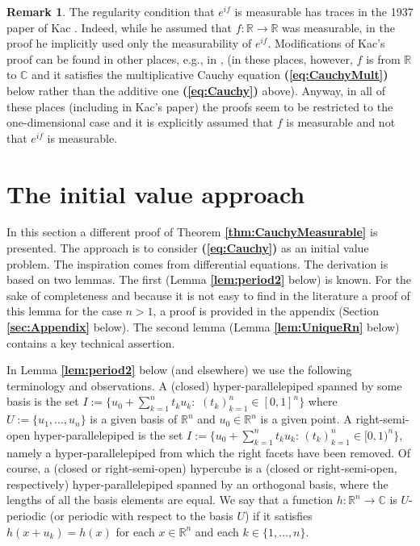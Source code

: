 \documentclass[12 pt]{amsart}
\theoremstyle{definition}
\newtheorem{remark}[thm]{Remark}
\newcommand{\R}{\mathbb{R}}
\newcommand{\C}{\mathbb{C}}
\newcommand{\bref}[1]{\textbf{\ref{#1}}} %
\newcommand{\beqref}[1]{\textbf{(\ref{#1})}} %
\begin{document}
\begin{remark}\label{rem:Kac}
The regularity condition that $e^{if}$ is measurable has traces in the 1937 paper of Kac \cite{Kac}. Indeed, while he assumed that $f:\R\to\R$ was measurable, in the proof he implicitly  used only the  measurability of  $e^{if}$. Modifications of Kac's proof can be found in other places, e.g., in \cite[pp. 54--56]{AczelDhombres}, \cite[pp. 39--40]{Czerwik2002book} (in these places, however, $f$ is  from $\R$ to $\C$ and it satisfies the multiplicative Cauchy equation  \beqref{eq:CauchyMult} below rather than the additive one \beqref{eq:Cauchy} above). Anyway, in all of these places (including in Kac's paper) the proofs seem to be restricted to the one-dimensional case and it is explicitly assumed that $f$ is measurable and not that $e^{if}$ is measurable. 
\end{remark}



\section{The initial value approach}\label{sec:IVP}
In this section a different proof of Theorem \bref{thm:CauchyMeasurable} is presented. 
The approach is to consider \beqref{eq:Cauchy} as an initial value problem. The inspiration comes from differential equations. The derivation is based on two lemmas. 
The first (Lemma \bref{lem:period2} below) is known. For the sake of completeness  and because it is not easy to find in the literature a proof of this lemma for the case $n>1$, a proof is provided in the appendix (Section \bref{sec:Appendix} below). The second lemma (Lemma \bref{lem:UniqueRn} below) contains a key technical assertion. 
 
In Lemma \bref{lem:period2} below (and elsewhere) we use the following terminology and observations. A (closed) hyper-parallelepiped spanned by some basis  is the set $I:=\{u_0+\sum_{k=1}^n t_k u_k:\,\,(t_k)_{k=1}^n\in [0,1]^n\}$  where $U:=\{u_1,\ldots,u_n\}$ is a given  basis of $\R^n$ and $u_0\in\R^n$ is a given point. A right-semi-open hyper-parallelepiped is the  set $I:=\{u_0+\sum_{k=1}^n t_k u_k: \,(t_k)_{k=1}^n\in [0,1)^n\}$, namely a hyper-parallelepiped from which the right facets have been removed. Of course, a (closed or right-semi-open) hypercube is a (closed or right-semi-open, respectively) hyper-parallelepiped spanned by an orthogonal basis, where the lengths of all the basis elements are equal. We say that a function $h:\R^n\to\C$ is $U$-periodic (or periodic with respect to the basis $U$) if it satisfies  $h(x+u_k)=h(x)$ for each $x\in \R^n$ and each $k\in \{1,\ldots,n\}$.
\end{document}
